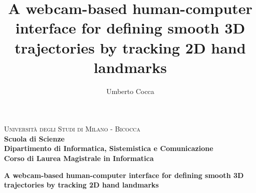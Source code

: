 \documentclass[mscthesis, 11pt, oneside, openany]{usiinfthesis}
\title{A webcam-based human-computer interface for defining smooth 3D trajectories by tracking 2D hand landmarks}
\author{Umberto Cocca} %
\begin{document}
\thispagestyle{empty}
\begin{titlepage}
	
	\noindent
	\begin{minipage}[t]{0.18\textwidth}
	\end{minipage}
	\begin{minipage}[t]{0.82\textwidth}
		{
			{\textsc{Università degli Studi di Milano - Bicocca}} \\
			\textbf{Scuola di Scienze} \\
			\textbf{Dipartimento di Informatica, Sistemistica e Comunicazione} \\
			\textbf{Corso di Laurea Magistrale in Informatica} \\
			\par
		}
	\end{minipage}
	
	\vspace{35mm}
	
	\begin{center}
		{\LARGE{
				\textbf{A webcam-based human-computer interface for defining smooth 3D trajectories by tracking 2D hand landmarks}
				\par
		}}
	\end{center}
	

\end{titlepage}
\end{document}
